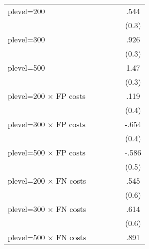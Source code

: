 \begin{table}[htbp]
\begin{tabular}{l*{5}{c}}
plevel=200      &                  &                  &                  &                  &     .544\sym{*}  \\
                &                  &                  &                  &                  &    (0.3)         \\
plevel=300      &                  &                  &                  &                  &     .926\sym{***}\\
                &                  &                  &                  &                  &    (0.3)         \\
plevel=500      &                  &                  &                  &                  &     1.47\sym{***}\\
                &                  &                  &                  &                  &    (0.3)         \\
plevel=200 $\times$ FP costs&                  &                  &                  &                  &     .119         \\
                &                  &                  &                  &                  &    (0.4)         \\
plevel=300 $\times$ FP costs&                  &                  &                  &                  &    -.654         \\
                &                  &                  &                  &                  &    (0.4)         \\
plevel=500 $\times$ FP costs&                  &                  &                  &                  &    -.586         \\
                &                  &                  &                  &                  &    (0.5)         \\
plevel=200 $\times$ FN costs&                  &                  &                  &                  &     .545         \\
                &                  &                  &                  &                  &    (0.6)         \\
plevel=300 $\times$ FN costs&                  &                  &                  &                  &     .614         \\
                &                  &                  &                  &                  &    (0.6)         \\
plevel=500 $\times$ FN costs&                  &                  &                  &                  &     .891         \\

\end{tabular}
\end{table}

